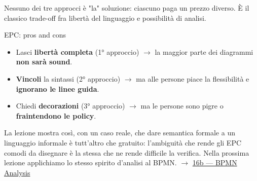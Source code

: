 Nessuno dei tre approcci è "la" soluzione: ciascuno paga un prezzo diverso. È il classico trade-off fra libertà del linguaggio e possibilità di analisi.

\begin{boxabstract}{EPC: pros and cons}
\begin{itemize}
\item Lasci \textbf{libertà completa} (1° approccio) $\rightarrow$ la maggior parte dei diagrammi \textbf{non sarà sound}.
\item \textbf{Vincoli} la sintassi (2° approccio) $\rightarrow$ ma alle persone piace la flessibilità e \textbf{ignorano le linee guida}.
\item Chiedi \textbf{decorazioni} (3° approccio) $\rightarrow$ ma le persone sono pigre o \textbf{fraintendono le policy}.
\end{itemize}
\end{boxabstract}

La lezione mostra così, con un caso reale, che dare semantica formale a un linguaggio informale è tutt'altro che gratuito: l'ambiguità che rende gli EPC comodi da disegnare è la stessa che ne rende difficile la verifica. Nella prossima lezione applichiamo lo stesso spirito d'analisi al BPMN. $\rightarrow$ \hyperref[ch:16b]{16b — BPMN Analysis}